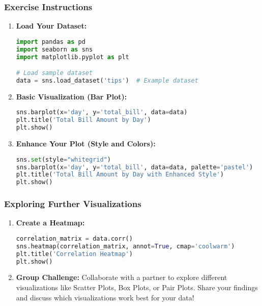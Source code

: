 \documentclass[aspectratio=169]{beamer}
\begin{document}
\begin{frame}[fragile]
    \frametitle{Exercise Instructions}
    \begin{enumerate}
        \item \textbf{Load Your Dataset:}
        \begin{lstlisting}[language=python]
import pandas as pd
import seaborn as sns
import matplotlib.pyplot as plt

# Load sample dataset
data = sns.load_dataset('tips')  # Example dataset
        \end{lstlisting}

        \item \textbf{Basic Visualization (Bar Plot):}
        \begin{lstlisting}[language=python]
sns.barplot(x='day', y='total_bill', data=data)
plt.title('Total Bill Amount by Day')
plt.show()
        \end{lstlisting}

        \item \textbf{Enhance Your Plot (Style and Colors):}
        \begin{lstlisting}[language=python]
sns.set(style="whitegrid")
sns.barplot(x='day', y='total_bill', data=data, palette='pastel')
plt.title('Total Bill Amount by Day with Enhanced Style')
plt.show()
        \end{lstlisting}
    \end{enumerate}
\end{frame}

\begin{frame}[fragile]
    \frametitle{Exploring Further Visualizations}
    \begin{enumerate}[resume]
        \item \textbf{Create a Heatmap:}
        \begin{lstlisting}[language=python]
correlation_matrix = data.corr()
sns.heatmap(correlation_matrix, annot=True, cmap='coolwarm')
plt.title('Correlation Heatmap')
plt.show()
        \end{lstlisting}

        \item \textbf{Group Challenge:}
        Collaborate with a partner to explore different visualizations like Scatter Plots, Box Plots, or Pair Plots. Share your findings and discuss which visualizations work best for your data!
    \end{enumerate}
\end{frame}
\end{document}
